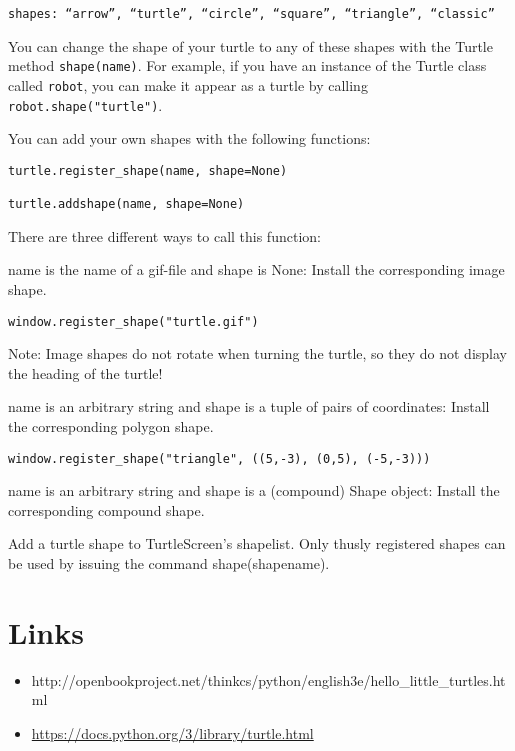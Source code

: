 \begin{verbatim}
shapes: “arrow”, “turtle”, “circle”, “square”, “triangle”, “classic”
\end{verbatim}

You can change the shape of your turtle to any of these shapes with the
Turtle method \texttt{shape(name)}. For example, if you have an instance
of the Turtle class called \texttt{robot}, you can make it appear as a
turtle by calling \texttt{robot.shape("turtle")}.

You can add your own shapes with the following functions:

\begin{verbatim}
turtle.register_shape(name, shape=None)

turtle.addshape(name, shape=None)
\end{verbatim}

There are three different ways to call this function:

name is the name of a gif-file and shape is None: Install the
corresponding image shape.

\begin{verbatim}
window.register_shape("turtle.gif")
\end{verbatim}

Note: Image shapes do not rotate when turning the turtle, so they do not
display the heading of the turtle!

name is an arbitrary string and shape is a tuple of pairs of
coordinates: Install the corresponding polygon shape.

\begin{verbatim}
window.register_shape("triangle", ((5,-3), (0,5), (-5,-3)))
\end{verbatim}

name is an arbitrary string and shape is a (compound) Shape object:
Install the corresponding compound shape.

Add a turtle shape to TurtleScreen's shapelist. Only thusly registered
shapes can be used by issuing the command shape(shapename).

\section{Links}\label{links}

\begin{itemize}

\item
  http://openbookproject.net/thinkcs/python/english3e/hello\_little\_turtles.html
\item
  \url{https://docs.python.org/3/library/turtle.html}
\end{itemize}

